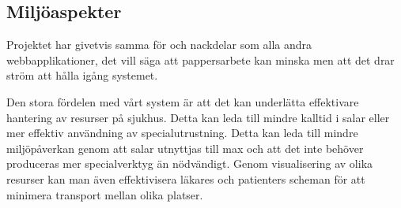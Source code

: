 \subsection{Miljöaspekter}
Projektet har givetvis samma för och nackdelar som alla andra webbapplikationer, det vill säga att pappersarbete kan minska men att det drar ström att hålla igång systemet.

Den stora fördelen med vårt system är att det kan underlätta effektivare hantering av resurser på sjukhus. Detta kan leda till mindre kalltid i salar eller mer effektiv användning av specialutrustning. Detta kan leda till mindre miljöpåverkan genom att salar utnyttjas till max och att det inte behöver produceras mer specialverktyg än nödvändigt. Genom visualisering av olika resurser kan man även effektivisera läkares och patienters scheman för att minimera transport mellan olika platser. 
